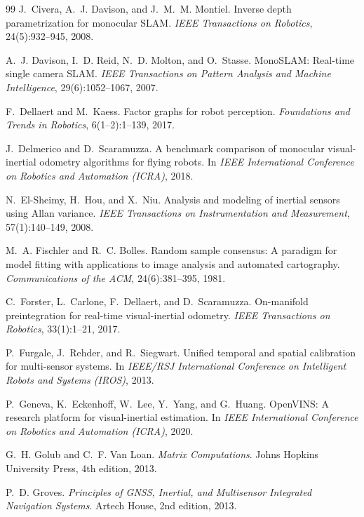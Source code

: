 \begin{thebibliography}{99}
 J.~Civera, A.~J. Davison, and J.~M.~M. Montiel. Inverse depth parametrization for monocular SLAM. \emph{IEEE Transactions on Robotics}, 24(5):932--945, 2008.

 A.~J. Davison, I.~D. Reid, N.~D. Molton, and O.~Stasse. MonoSLAM: Real-time single camera SLAM. \emph{IEEE Transactions on Pattern Analysis and Machine Intelligence}, 29(6):1052--1067, 2007.

 F.~Dellaert and M.~Kaess. Factor graphs for robot perception. \emph{Foundations and Trends in Robotics}, 6(1--2):1--139, 2017.

 J.~Delmerico and D.~Scaramuzza. A benchmark comparison of monocular visual-inertial odometry algorithms for flying robots. In \emph{IEEE International Conference on Robotics and Automation (ICRA)}, 2018.

 N.~El-Sheimy, H.~Hou, and X.~Niu. Analysis and modeling of inertial sensors using Allan variance. \emph{IEEE Transactions on Instrumentation and Measurement}, 57(1):140--149, 2008.

 M.~A. Fischler and R.~C. Bolles. Random sample consensus: A paradigm for model fitting with applications to image analysis and automated cartography. \emph{Communications of the ACM}, 24(6):381--395, 1981.

 C.~Forster, L.~Carlone, F.~Dellaert, and D.~Scaramuzza. On-manifold preintegration for real-time visual-inertial odometry. \emph{IEEE Transactions on Robotics}, 33(1):1--21, 2017.

 P.~Furgale, J.~Rehder, and R.~Siegwart. Unified temporal and spatial calibration for multi-sensor systems. In \emph{IEEE/RSJ International Conference on Intelligent Robots and Systems (IROS)}, 2013.

 P.~Geneva, K.~Eckenhoff, W.~Lee, Y.~Yang, and G.~Huang. OpenVINS: A research platform for visual-inertial estimation. In \emph{IEEE International Conference on Robotics and Automation (ICRA)}, 2020.

 G.~H. Golub and C.~F. Van Loan. \emph{Matrix Computations}. Johns Hopkins University Press, 4th edition, 2013.

 P.~D. Groves. \emph{Principles of GNSS, Inertial, and Multisensor Integrated Navigation Systems}. Artech House, 2nd edition, 2013.


\end{thebibliography}
